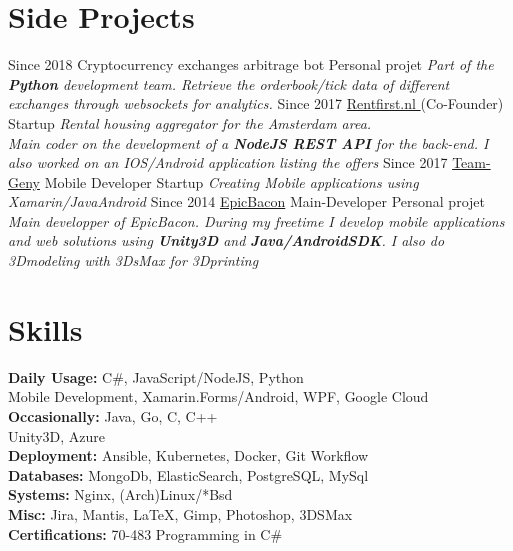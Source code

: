 \documentclass{emonides-cv}
\begin{document}
\vspace{1.5cm}

\section{Side Projects}
\begin{entrylist}
  \entry
    {Since  2018}
    {Cryptocurrency exchanges arbitrage bot {\normalfont }}
    {Personal projet}
    {\emph{Part of the \textbf{Python} development team. Retrieve the orderbook/tick data of different exchanges through websockets for analytics. }}
  \entry
    {Since  2017}
    {\href{https://www.Rentfirst.nl/}{Rentfirst.nl  } {\normalfont  (Co-Founder)}}
    {Startup}
    {\emph{Rental housing aggregator for the Amsterdam area. \\
    Main coder on the development of a \textbf{NodeJS REST API} for the back-end.
    I also worked on an IOS/Android application listing the offers}}
  \entry
    {Since  2017}
    {\href{http://www.teamgeny.com/}{Team-Geny} {\normalfont Mobile Developer}}
    {Startup}
    {\emph{Creating Mobile applications using Xamarin/JavaAndroid}}
  \entry
    {Since  2014}
    {\href{https://play.google.com/store/apps/developer?id=EpicBacon}{EpicBacon} {\normalfont Main-Developer}}
    {Personal projet}
    {\emph{Main developper of EpicBacon. During my freetime I develop mobile applications and web solutions using \textbf{Unity3D} and \textbf{Java/AndroidSDK}.
    I also do 3Dmodeling with 3DsMax for 3Dprinting  }}
\end{entrylist}
\section{Skills}
\normalsize
\textbf {Daily Usage:}   C\#, JavaScript/NodeJS, Python\\
\normalsize {  Mobile Development, Xamarin.Forms/Android, WPF, Google Cloud}\\
\textbf {Occasionally:} Java, Go, C, C++ \\
Unity3D, Azure\\
\textbf {Deployment:} Ansible, Kubernetes, Docker, Git Workflow\\
\textbf {Databases:} MongoDb, ElasticSearch, PostgreSQL, MySql\\
\textbf {Systems:} Nginx, (Arch)Linux/*Bsd \\
\textbf {Misc:} Jira, Mantis, \LaTeX, Gimp, Photoshop, 3DSMax\\
\textbf { Certifications: } 70-483 Programming in C\#
\end{document}

